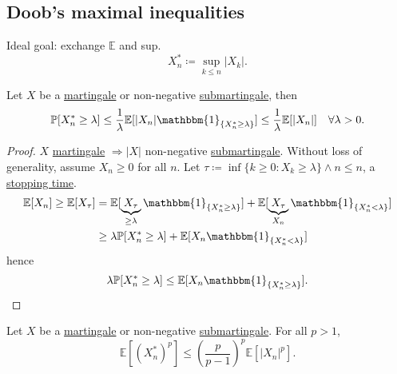 \documentclass{article}
\newcommand{\1}[1]{\mathbbm{1}_{#1}}
\newcommand{\Prob}{\mathbb{P}}
\newcommand{\E}{\mathbb{E}}
\begin{document}
\subsection{Doob's maximal inequalities}
Ideal goal: exchange $\E$ and sup.
\begin{equation*}
  X_n^* \coloneqq \sup_{k \leq n} |X_k|
.\end{equation*}
\begin{nthm}\label{thm:2.10}
  Let $X$ be a \hyperlink{def:martingale}{martingale} or non-negative \hyperlink{def:martingale}{submartingale}, then
  \begin{equation*}
    \Prob[X_n^* \geq \lambda] \leq \frac{1}{\lambda} \E[|X_n| \1{\{X_n^* \geq \lambda\}}] \leq \frac{1}{\lambda } \E[|X_n|] \quad \forall \lambda > 0
  .\end{equation*}
\end{nthm}
\begin{proof}
  $X$ \hyperlink{def:martingale}{martingale} $\Rightarrow |X|$ non-negative \hyperlink{def:martingale}{submartingale}. Without loss of generality, assume $X_n \geq 0$ for all $n$.
  Let $\tau \coloneqq \inf\{k \geq 0 : X_k \geq \lambda\} \land n \leq n$, a \hyperlink{def:stopping}{stopping time}.
  \begin{align*}
    \E[X_n] \geq \E[X_\tau] &= \E[\underbrace{X_\tau}_{\geq \lambda} \1{\{X_n^* \geq \lambda\}}] + \E[\underbrace{X_\tau}_{X_n} \1{\{X_n^* < \lambda\}}] \\
    &\geq \lambda \Prob[X_n^* \geq \lambda] + \E[X_n \1{\{X_n^* < \lambda\}}]
  \end{align*}
  hence
  \begin{equation*}
    \lambda \Prob[X_n^* \geq \lambda] \leq \E[X_n \1{\{X_n^* \geq \lambda\}}]
  .\qedhere\end{equation*}
\end{proof}
\begin{nthm}\label{thm:2.11}
  Let $X$ be a \hyperlink{def:martingale}{martingale} or non-negative \hyperlink{def:martingale}{submartingale}. For all $p > 1$,
  \begin{equation*}
    \E[(X_n^*)^p] \leq \left(\frac{p}{p-1}\right)^p \E[|X_n|^p]
  .\end{equation*}
\end{nthm}
\end{document}
